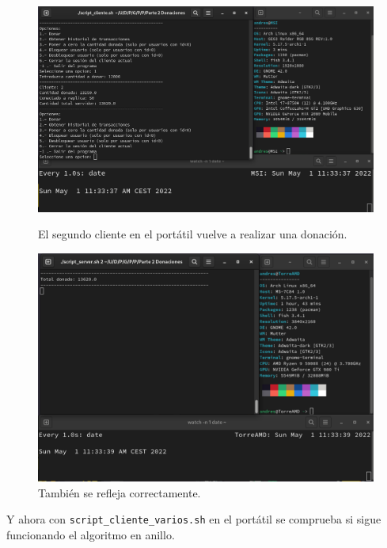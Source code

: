 \documentclass{article}
\begin{document}
\begin{figure}[H]
    \centering
    \begin{minipage}[H]{0.49\textwidth}
        \centering
        \includegraphics[width=\textwidth]{imagenes/multiples ordenadores/Cliente/Screenshot from 2022-05-01 11-33-44.png}
        \caption{El segundo cliente en el portátil vuelve a realizar una donación.}
    \end{minipage}
    \hfill
    \begin{minipage}[H]{0.49\textwidth}
        \centering
        \includegraphics[width=\textwidth]{imagenes/multiples ordenadores/Servidor/Screenshot from 2022-05-01 11-33-44.png}
        \caption{También se refleja correctamente.}
    \end{minipage}
\end{figure}

\newpage

Y ahora con \verb|script_cliente_varios.sh| en el portátil se comprueba si sigue funcionando el algoritmo en anillo.
\end{document}
